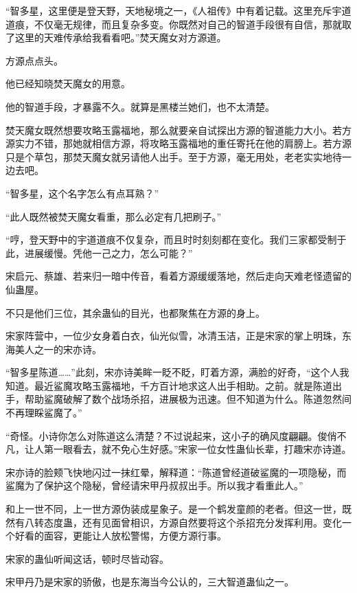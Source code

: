 
\begin{this_body}

“智多星，这里便是登天野，天地秘境之一，《人祖传》中有着记载。这里充斥宇道道痕，不仅毫无规律，而且复杂多变。你既然对自己的智道手段很有自信，那就取了这里的天难传承给我看看吧。”焚天魔女对方源道。

方源点点头。

他已经知晓焚天魔女的用意。

他的智道手段，才暴露不久。就算是黑楼兰她们，也不太清楚。

焚天魔女既然想要攻略玉露福地，那么就要亲自试探出方源的智道能力大小。若方源实力不错，那她就相信方源，将攻略玉露福地的重任寄托在他的肩膀上。若方源只是个草包，那焚天魔女就另请他人出手。至于方源，毫无用处，老老实实地待一边去吧。

“智多星，这个名字怎么有点耳熟？”

“此人既然被焚天魔女看重，那么必定有几把刷子。”

“哼，登天野中的宇道道痕不仅复杂，而且时时刻刻都在变化。我们三家都受制于此，进展缓慢。凭他一己之力，怎么可能？”

宋启元、蔡雄、若来归一暗中传音，看着方源缓缓落地，然后走向天难老怪遗留的仙蛊屋。

不只是他们三位，其余蛊仙的目光，也都聚焦在方源的身上。

宋家阵营中，一位少女身着白衣，仙光似雪，冰清玉洁，正是宋家的掌上明珠，东海美人之一的宋亦诗。

“智多星陈道……”此刻，宋亦诗美眸一眨不眨，盯着方源，满脸的好奇，“这个人我知道。最近鲨魔攻略玉露福地，千方百计地求这人出手相助。之前。就是陈道出手，帮助鲨魔破解了数个战场杀招，进展极为迅速。但不知道为什么。陈道忽然间不再理睬鲨魔了。”

“奇怪。小诗你怎么对陈道这么清楚？不过说起来，这小子的确风度翩翩。俊俏不凡，让人第一眼看去，就不免心生好感。”宋家一位女性蛊仙长辈，打趣宋亦诗道。

宋亦诗的脸颊飞快地闪过一抹红晕，解释道：“陈道曾经道破鲨魔的一项隐秘，而鲨魔为了保护这个隐秘，曾经请宋甲丹叔叔出手。所以我才看重此人。”

和上一世不同，上一世方源伪装成星象子。是一个鹤发童颜的老者。但这一世，既然有八转态度蛊，还有见面曾相识，方源自然要将这个杀招充分发挥利用。变化一个好看的面容，更能让人放松警惕，方便方源行事。

宋家的蛊仙听闻这话，顿时尽皆动容。

宋甲丹乃是宋家的骄傲，也是东海当今公认的，三大智道蛊仙之一。


\end{this_body}
